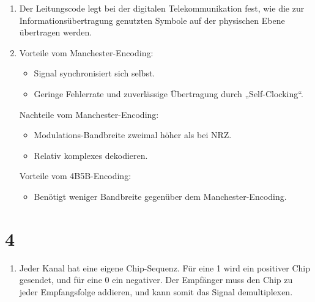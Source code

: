 \documentclass[ngerman]{scrartcl}
\begin{document}
\begin{enumerate}[label=\alph*)]
  \item
  Der Leitungscode legt bei der digitalen Telekommunikation fest, wie die zur
  Informationsübertragung genutzten Symbole auf der physischen Ebene übertragen werden.

  \addtocounter{enumi}{2}
  \item
  Vorteile vom Manchester-Encoding:
  \begin{itemize}
    \item Signal synchronisiert sich selbst.
    \item Geringe Fehlerrate und zuverlässige Übertragung durch „Self-Clocking“.
  \end{itemize}

  Nachteile vom Manchester-Encoding:
  \begin{itemize}
    \item Modulations-Bandbreite zweimal höher als bei NRZ.
    \item Relativ komplexes dekodieren.
  \end{itemize}

  Vorteile vom 4B5B-Encoding:
  \begin{itemize}
    \item Benötigt weniger Bandbreite gegenüber dem Manchester-Encoding.
  \end{itemize}
\end{enumerate}


\section*{4}

\begin{enumerate}[label=\alph*)]
  \item
  Jeder Kanal hat eine eigene Chip-Sequenz. Für eine 1 wird ein positiver Chip gesendet, und für eine 0 ein negativer. Der Empfänger muss den Chip zu jeder Empfangsfolge addieren, und kann somit das Signal demultiplexen.
\end{enumerate}
\end{document}

